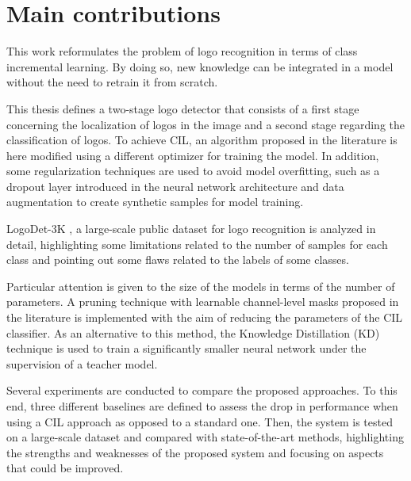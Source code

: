 \section{Main contributions}
This work reformulates the problem of logo recognition in terms of class incremental learning. By doing so, new knowledge can be integrated in a model without the need to retrain it from scratch.

This thesis defines a two-stage logo detector that consists of a first stage concerning the localization of logos in the image and a second stage regarding the classification of logos. 
To achieve CIL, an algorithm proposed in the literature is here modified using a different optimizer for training the model. In addition, some regularization techniques are used to avoid model overfitting, such as a dropout layer introduced in the neural network architecture and data augmentation to create synthetic samples for model training.

LogoDet-3K \cite{wang2022logodet}, a large-scale public dataset for logo recognition is analyzed in detail, highlighting some limitations related to the number of samples for each class and pointing out some flaws related to the labels of some classes.

Particular attention is given to the size of the models in terms of the number of parameters. A pruning technique with learnable channel-level masks proposed in the literature is implemented with the aim of reducing the parameters of the CIL classifier.
As an alternative to this method, the Knowledge Distillation (KD) technique is used to train a significantly smaller neural network under the supervision of a teacher model.

Several experiments are conducted to compare the proposed approaches. To this end, three different baselines are defined to assess the drop in performance when using a CIL approach as opposed to a standard one. Then, the system is tested on a large-scale dataset and compared with state-of-the-art methods, highlighting the strengths and weaknesses of the proposed system and focusing on aspects that could be improved.


